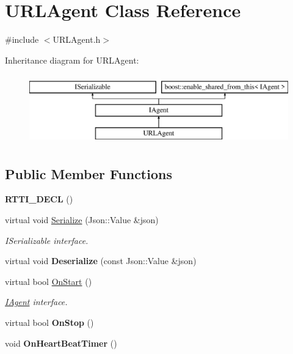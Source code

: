 \hypertarget{class_u_r_l_agent}{}\section{U\+R\+L\+Agent Class Reference}
\label{class_u_r_l_agent}


{\ttfamily \#include $<$U\+R\+L\+Agent.\+h$>$}

Inheritance diagram for U\+R\+L\+Agent\+:\begin{figure}[H]
\begin{center}
\leavevmode
\includegraphics[height=3.000000cm]{class_u_r_l_agent}
\end{center}
\end{figure}
\subsection*{Public Member Functions}
\begin{DoxyCompactItemize}
\item 
\mbox{\label{class_u_r_l_agent_a25b983d8e03216705568557a5e6ab73a}} 
{\bfseries R\+T\+T\+I\+\_\+\+D\+E\+CL} ()
\item 
\mbox{\label{class_u_r_l_agent_a77f059d4d63b24e78cea5faf6ce0dcf5}} 
virtual void \hyperlink{class_u_r_l_agent_a77f059d4d63b24e78cea5faf6ce0dcf5}{Serialize} (Json\+::\+Value \&json)
\begin{DoxyCompactList}\small\item\em I\+Serializable interface. \end{DoxyCompactList}\item 
\mbox{\label{class_u_r_l_agent_a1895e824f6c3c7d8f01e0400b2cb101a}} 
virtual void {\bfseries Deserialize} (const Json\+::\+Value \&json)
\item 
\mbox{\label{class_u_r_l_agent_adda66bbf1698fa889a188642806c7eb2}} 
virtual bool \hyperlink{class_u_r_l_agent_adda66bbf1698fa889a188642806c7eb2}{On\+Start} ()
\begin{DoxyCompactList}\small\item\em \hyperlink{class_i_agent}{I\+Agent} interface. \end{DoxyCompactList}\item 
\mbox{\label{class_u_r_l_agent_a3f9ffbcb875a9639035d2c4a590967c7}} 
virtual bool {\bfseries On\+Stop} ()
\item 
\mbox{\label{class_u_r_l_agent_a2b51d491ca90b72c41861358c5c67c04}} 
void {\bfseries On\+Heart\+Beat\+Timer} ()
\end{DoxyCompactItemize}

